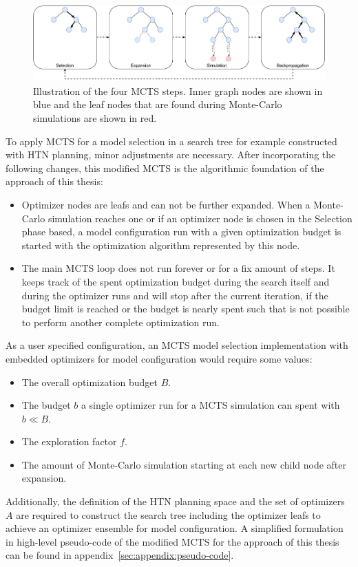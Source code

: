 \begin{figure}[ht!]
    \centering
    \includegraphics[width=\textwidth]{gfx/Figures/Approach/MCTS.pdf}
    \caption[Illustration of the four MCTS steps.]{Illustration of the four MCTS steps. Inner graph nodes are shown in blue and the leaf nodes that are found during Monte-Carlo simulations are shown in red.}
    \label{fig:approach:mcts}
\end{figure}

To apply MCTS for a model selection in a search tree for example constructed with HTN planning, minor adjustments are necessary.
After incorporating the following changes, this modified MCTS is the algorithmic foundation of the approach of this thesis:
\begin{itemize}
    \item Optimizer nodes are leafs and can not be further expanded. When a Monte-Carlo simulation reaches one or if an optimizer node is chosen in the Selection phase based, a model configuration run with a given optimization budget is started with the optimization algorithm represented by this node.
    \item The main MCTS loop does not run forever or for a fix amount of steps. It keeps track of the spent optimization budget during the search itself and during the optimizer runs and will stop after the current iteration, if the budget limit is reached or the budget is nearly spent such that is not possible to perform another complete optimization run.
\end{itemize}
As a user specified configuration, an MCTS model selection implementation with embedded optimizers for model configuration would require some values:
\begin{itemize}
    \item The overall optimization budget $B$.
    \item The budget $b$ a single optimizer run for a MCTS simulation can spent with $b \ll B$.
    \item The exploration factor $f$.
    \item The amount of Monte-Carlo simulation starting at each new child node after expansion.
\end{itemize}
Additionally, the definition of the HTN planning space and the set of optimizers $A$ are required to construct the search tree including the optimizer leafs to achieve an optimizer ensemble for model configuration.
A simplified formulation  in high-level pseudo-code of the modified MCTS for the approach of this thesis can be found in appendix~\ref{sec:appendix:pseudo-code}.

